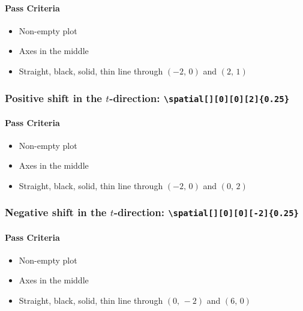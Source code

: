 \documentclass[pagesize,headsepline,parskip=half]{scrartcl}
\begin{document}
            \paragraph{Pass Criteria}
              \begin{itemize}
                \item Non-empty plot
                \item Axes in the middle
                \item Straight, black, solid, thin line through $(-2, \, 0)$ and $(2, \, 1)$
              \end{itemize}

            \subsubsection{Positive shift in the $t$-direction: \texttt{\textbackslash{}spatial[][0][0][2]\{0.25\}}}
              \begin{spacetimediagram}[grid, ymin=-4, ymax=4]
              \end{spacetimediagram}

              \paragraph{Pass Criteria}
                \begin{itemize}
                  \item Non-empty plot
                  \item Axes in the middle
                  \item Straight, black, solid, thin line through $(-2, \, 0)$ and $(0, \, 2)$
                \end{itemize}

            \subsubsection{Negative shift in the $t$-direction: \texttt{\textbackslash{}spatial[][0][0][-2]\{0.25\}}}
              \begin{spacetimediagram}[grid, ymin=-4, ymax=4]
              \end{spacetimediagram}

              \paragraph{Pass Criteria}
                \begin{itemize}
                  \item Non-empty plot
                  \item Axes in the middle
                  \item Straight, black, solid, thin line through $(0, \, -2)$ and $(6, \, 0)$
                \end{itemize}
\end{document}
